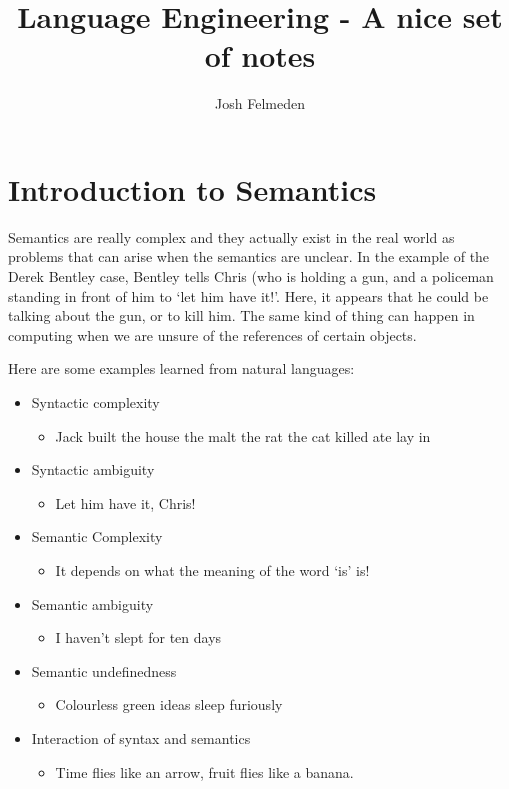 \documentclass[11pt,a4paper,titlepage,dvipsnames,cmyk]{scrartcl}
\title{Language Engineering - A nice set of notes}
\author{Josh Felmeden}
\begin{document}
\maketitle
\tableofcontents

\newpage

\section{Introduction to Semantics}%
\label{sec:intro-semantics}

Semantics are really complex and they actually exist in the real world as
problems that can arise when the semantics are unclear. In the example of
the Derek Bentley case, Bentley tells Chris (who is holding a gun, and a
policeman standing in front of him to `let him have it!'. Here, it
appears that he could be talking about the gun, or to kill him. The same
kind of thing can happen in computing when we are unsure of the references
of certain objects. 

Here are some examples learned from natural languages:
\begin{itemize}
    \item Syntactic complexity
        \begin{itemize}
            \item Jack built the house the malt the rat the cat killed ate
                lay in
        \end{itemize}
    \item Syntactic ambiguity
        \begin{itemize}
            \item Let him have it, Chris!
        \end{itemize}
        \item Semantic Complexity
            \begin{itemize}
                \item It depends on what the meaning of the word `is' is!
            \end{itemize}
        \item Semantic ambiguity
            \begin{itemize}
                \item I haven't slept for ten days
            \end{itemize}
            \item Semantic undefinedness
            \begin{itemize}
                \item Colourless green ideas sleep furiously
            \end{itemize}
            \item Interaction of syntax and semantics
                \begin{itemize}
                    \item Time flies like an arrow, fruit flies like a
                        banana.
                \end{itemize}
\end{itemize}
\end{document}
